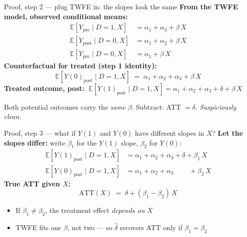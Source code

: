 \documentclass[aspectratio=169,11pt]{beamer}
\begin{document}
\begin{frame}{Proof, step 2 --- plug TWFE in: the slopes look the same}
\vspace{0.3em}
\textbf{From the TWFE model, observed conditional means:}
\begin{align*}
\mathbb{E}[Y_{\text{pre}}  \mid D{=}1, X] &= \alpha_1 + \alpha_3 + \beta\, X \\[3pt]
\mathbb{E}[Y_{\text{post}} \mid D{=}0, X] &= \alpha_1 + \alpha_2 + \beta\, X \\[3pt]
\mathbb{E}[Y_{\text{pre}}  \mid D{=}0, X] &= \alpha_1 + \beta\, X
\end{align*}
\textbf{Counterfactual for treated (step 1 identity):}
\[
\mathbb{E}[Y(0)_{\text{post}} \mid D{=}1, X] \;=\; \alpha_1 + \alpha_2 + \alpha_3 + \beta\, X
\]
\textbf{Treated outcome, post:} $\;\mathbb{E}[Y(1)_{\text{post}} \mid D{=}1, X] = \alpha_1 + \alpha_2 + \alpha_3 + \delta + \beta\, X$\\[0.4em]
\begin{center}\color{warmgray}\small
Both potential outcomes carry the \textit{same} $\beta$. Subtract: ATT $= \delta$. \textit{Suspiciously clean.}
\end{center}
\end{frame}

\begin{frame}{Proof, step 3 --- what if $Y(1)$ and $Y(0)$ have different slopes in $X$?}
\vspace{0.3em}
\textbf{Let the slopes differ:} write $\beta_1$ for the $Y(1)$ slope, $\beta_2$ for $Y(0)$:
\begin{align*}
\mathbb{E}[Y(1)_{\text{post}} \mid D{=}1, X] &= \alpha_1 + \alpha_2 + \alpha_3 + \delta + \beta_1\, X \\[3pt]
\mathbb{E}[Y(0)_{\text{post}} \mid D{=}1, X] &= \alpha_1 + \alpha_2 + \alpha_3 \phantom{\;+\;\delta} + \beta_2\, X
\end{align*}
\textbf{True ATT given $X$:}
\[
\text{ATT}(X) \;=\; \delta + (\beta_1 - \beta_2)\, X
\]
\begin{itemize}\setlength\itemsep{0.3em}\small
  \item If $\beta_1 \neq \beta_2$, the treatment effect \textit{depends on} $X$
  \item TWFE fits one $\beta$, not two --- so $\hat\delta$ recovers ATT only if $\beta_1 = \beta_2$
\end{itemize}
\end{frame}
\end{document}
